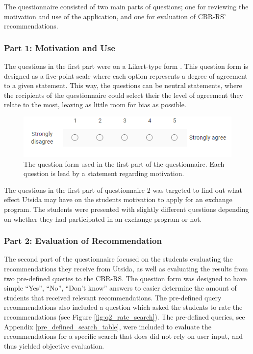 The questionnaire consisted of two main parts of questions; one for reviewing the motivation and use of the application, and one for evaluation of CBR-RS' recommendations.


\subsubsection{Part 1: Motivation and Use}
The questions in the first part were on a Likert-type form \cite{likert1932technique}. This question form is designed as a five-point scale where each option represents a degree of agreement to a given statement. This way, the questions can be neutral statements, where the recipients of the questionnaire could select their the level of agreement they relate to the most, leaving as little room for bias as possible. 

\begin{figure}[H]
    \centering
    \includegraphics[width=1\textwidth]{fig/q2_question_form.PNG}
    \caption{The question form used in the first part of the questionnaire. Each question is lead by a statement regarding motivation.}
    \label{fig:q2_question_form}
\end{figure}

The questions in the first part of questionnaire 2 was targeted to find out what effect Utsida may have on the students motivation to apply for an exchange program. The students were presented with slightly different questions depending on whether they had participated in an exchange program or not.

\subsubsection{Part 2: Evaluation of Recommendation}

The second part of the questionnaire focused on the students evaluating the recommendations they receive from Utsida, as well as evaluating the results from two pre-defined queries to the CBR-RS. The question form was designed to have simple \enquote{Yes}, \enquote{No}, \enquote{Don't know} answers to easier determine the amount of students that received relevant recommendations. The pre-defined query recommendations also included a question which asked the students to rate the recommendations (see Figure \ref{fig:q2_rate_search}). The pre-defined queries, see Appendix \ref{pre_defined_search_table}, were included to evaluate the recommendations for a specific search that does did not rely on user input, and thus yielded objective evaluation. 


